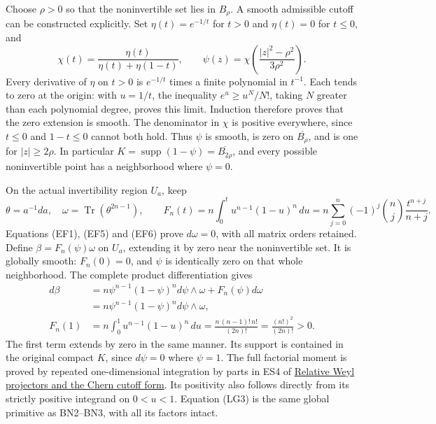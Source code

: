 \documentclass[
  11pt,
]{article}
\begin{document}
Choose \(\rho>0\) so that the noninvertible set lies in \(B_\rho\). A
smooth admissible cutoff can be constructed explicitly. Set
\(\eta(t)=e^{-1/t}\) for \(t>0\) and \(\eta(t)=0\) for \(t\le0\), and \[
 \chi(t)=\frac{\eta(t)}{\eta(t)+\eta(1-t)},\qquad
 \psi(z)=\chi\!\left(\frac{|z|^2-\rho^2}{3\rho^2}\right).
 \tag{LG1}
\] Every derivative of \(\eta\) on \(t>0\) is \(e^{-1/t}\) times a
finite polynomial in \(t^{-1}\). Each tends to zero at the origin: with
\(u=1/t\), the inequality \(e^u\ge u^N/N!\), taking \(N\) greater than
each polynomial degree, proves this limit. Induction therefore proves
that the zero extension is smooth. The denominator in \(\chi\) is
positive everywhere, since \(t\le0\) and \(1-t\le0\) cannot both hold.
Thus \(\psi\) is smooth, is zero on \(\overline{B_\rho}\), and is one
for \(|z|\ge2\rho\). In particular
\(K=\operatorname{supp}(1-\psi)=\overline{B_{2\rho}}\), and every
possible noninvertible point has a neighborhood where \(\psi=0\).

On the actual invertibility region \(U_a\), keep \[
 \theta=a^{-1}da,\quad\omega=\operatorname{Tr}(\theta^{2n-1}),
 \qquad
 F_n(t)=n\int_0^t u^{n-1}(1-u)^n\,du
       =n\sum_{j=0}^n(-1)^j\binom nj\frac{t^{n+j}}{n+j}.
 \tag{LG2}
\] Equations (EF1), (EF5) and (EF6) prove \(d\omega=0\), with all matrix
orders retained. Define \(\beta=F_n(\psi)\omega\) on \(U_a\), extending
it by zero near the noninvertible set. It is globally smooth:
\(F_n(0)=0\), and \(\psi\) is identically zero on that whole
neighborhood. The complete product differentiation gives \[
 \begin{aligned}
 d\beta
 &=n\psi^{n-1}(1-\psi)^n d\psi\wedge\omega
                         +F_n(\psi)d\omega\\
 &=n\psi^{n-1}(1-\psi)^n d\psi\wedge\omega,\\
 F_n(1)&=n\int_0^1u^{n-1}(1-u)^n\,du
           =\frac{n\,(n-1)!\,n!}{(2n)!}
           =\frac{(n!)^2}{(2n)!}>0.
 \end{aligned}
 \tag{LG3}
\] The first term extends by zero in the same manner. Its support is
contained in the original compact \(K\), since \(d\psi=0\) where
\(\psi=1\). The full factorial moment is proved by repeated
one-dimensional integration by parts in ES4 of
\href{relative-projectors-chern-cutoff.pdf}{Relative Weyl projectors and
the Chern cutoff form}. Its positivity also follows directly from its
strictly positive integrand on \(0<u<1\). Equation (LG3) is the same
global primitive as BN2--BN3, with all its factors intact.
\end{document}

